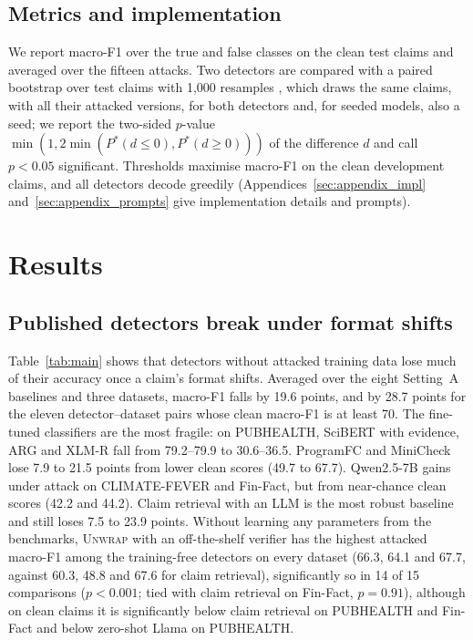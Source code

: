 \documentclass[11pt]{article}
\newcommand{\method}{\textsc{Unwrap}}
\begin{document}
\subsection{Metrics and implementation}

We report macro-F1 over the true and false classes on the clean test claims and averaged over the fifteen attacks. Two detectors are compared with a paired bootstrap over test claims with 1,000 resamples \citep{efron1993bootstrap}, which draws the same claims, with all their attacked versions, for both detectors and, for seeded models, also a seed; we report the two-sided $p$-value $\min(1, 2\min(P^*(d\le 0), P^*(d\ge 0)))$ of the difference $d$ and call $p<0.05$ significant. Thresholds maximise macro-F1 on the clean development claims, and all detectors decode greedily (Appendices~\ref{sec:appendix_impl} and~\ref{sec:appendix_prompts} give implementation details and prompts).

\section{Results}
\label{sec:results}




\subsection{Published detectors break under format shifts}

Table~\ref{tab:main} shows that detectors without attacked training data lose much of their accuracy once a claim's format shifts. Averaged over the eight Setting~A baselines and three datasets, macro-F1 falls by 19.6 points, and by 28.7 points for the eleven detector--dataset pairs whose clean macro-F1 is at least 70. The fine-tuned classifiers are the most fragile: on PUBHEALTH, SciBERT with evidence, ARG and XLM-R fall from 79.2--79.9 to 30.6--36.5. ProgramFC and MiniCheck lose 7.9 to 21.5 points from lower clean scores (49.7 to 67.7). Qwen2.5-7B gains under attack on CLIMATE-FEVER and Fin-Fact, but from near-chance clean scores (42.2 and 44.2). Claim retrieval with an LLM is the most robust baseline and still loses 7.5 to 23.9 points. Without learning any parameters from the benchmarks, \method{} with an off-the-shelf verifier has the highest attacked macro-F1 among the training-free detectors on every dataset (66.3, 64.1 and 67.7, against 60.3, 48.8 and 67.6 for claim retrieval), significantly so in 14 of 15 comparisons ($p<0.001$; tied with claim retrieval on Fin-Fact, $p=0.91$), although on clean claims it is significantly below claim retrieval on PUBHEALTH and Fin-Fact and below zero-shot Llama on PUBHEALTH.
\end{document}
